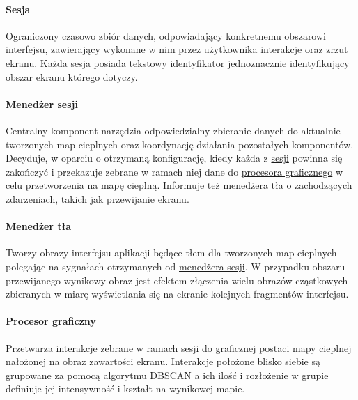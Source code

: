 \paragraph{Sesja}
\label{par:rs_session}
Ograniczony czasowo zbiór danych, odpowiadający konkretnemu obszarowi interfejsu, zawierający wykonane w nim przez użytkownika interakcje oraz zrzut ekranu. Każda sesja posiada tekstowy identyfikator jednoznacznie identyfikujący obszar ekranu którego dotyczy.

\paragraph{Menedżer sesji} 
\label{par:rs_session_manager}
Centralny komponent narzędzia odpowiedzialny zbieranie danych do aktualnie tworzonych map cieplnych oraz koordynację działania pozostałych komponentów. Decyduje, w oparciu o otrzymaną konfigurację, kiedy każda z \hyperref[par:rs_session]{sesji} powinna się zakończyć i przekazuje zebrane w ramach niej dane do  \hyperref[par:rs_graphical_processor]{procesora graficznego} w celu przetworzenia na mapę cieplną. Informuje też \hyperref[par:rs_bg_manager]{menedżera tła} o zachodzących zdarzeniach, takich jak przewijanie ekranu.

\paragraph{Menedżer tła} 
\label{par:rs_bg_manager}
Tworzy obrazy interfejsu aplikacji będące tłem dla tworzonych map cieplnych polegając na sygnałach otrzymanych od \hyperref[par:rs_session_manager]{menedżera sesji}. W przypadku obszaru przewijanego wynikowy obraz jest efektem złączenia wielu  obrazów cząstkowych zbieranych w miarę wyświetlania się na ekranie kolejnych fragmentów interfejsu.

\paragraph{Procesor graficzny} 
\label{par:rs_graphical_processor}
Przetwarza interakcje zebrane w ramach sesji do graficznej postaci mapy cieplnej nałożonej na obraz zawartości ekranu. Interakcje położone blisko siebie są grupowane za pomocą algorytmu DBSCAN \cite{DBSCAN_Wiki} a ich ilość i rozłożenie w grupie definiuje jej intensywność i kształt na wynikowej mapie.
